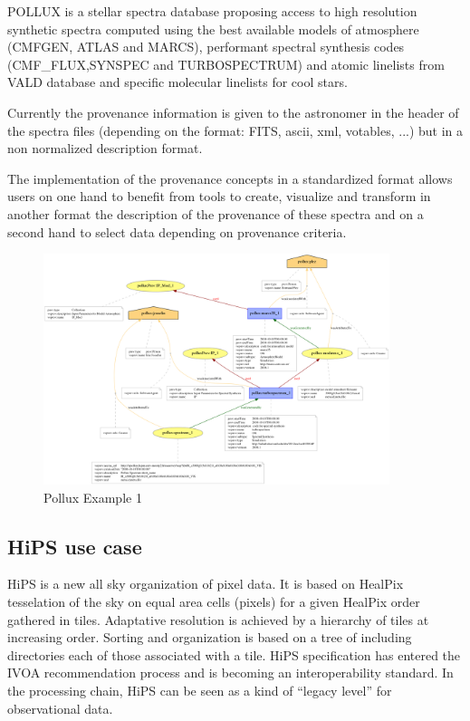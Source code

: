 POLLUX is a stellar spectra database proposing access to high resolution synthetic spectra computed using the best available models of atmosphere (CMFGEN, ATLAS and MARCS), performant spectral synthesis codes (CMF\_FLUX,SYNSPEC and TURBOSPECTRUM) and atomic linelists from VALD database and specific molecular linelists for cool stars. 

Currently the provenance information is given to the astronomer in the header of the spectra files (depending on the format: FITS, ascii, xml, votables, ...) but in a non normalized description format. 

The implementation of the provenance concepts in a standardized format allows users on one hand to benefit from tools to create, visualize and transform in another format the description of the provenance of these spectra and on a second hand to select data depending on provenance criteria.

\begin{figure}
\centering
\includegraphics[width=0.9\textwidth]{usecase_Pollux_example1.png}
\caption{Pollux Example 1}
\label{fig:pollux}
\end{figure}

\subsection{HiPS use case}
HiPS is a new all sky organization of pixel data. It is based on HealPix tesselation of the sky on equal area cells (pixels) for a given HealPix order gathered in tiles. Adaptative resolution is achieved by a hierarchy of tiles at increasing order. Sorting and organization is based on a tree of including directories each of those associated with a tile. HiPS specification has entered the IVOA recommendation process and is becoming an interoperability standard.
In the processing chain, HiPS can be seen as a kind of ``legacy level'' for observational data.

